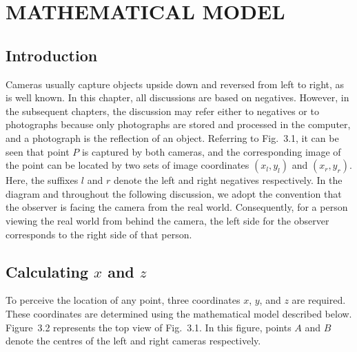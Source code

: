 \documentclass[12pt]{report}
\begin{document}
 \chapter{MATHEMATICAL MODEL} 
 \section{Introduction} 
 Cameras usually capture objects upside down and reversed from left to right, as is well known. In this chapter, all discussions are based on negatives. However, in the subsequent chapters, the discussion may refer either to negatives or to photographs because only photographs are stored and processed in the computer, and a photograph is the reflection of an object. Referring to Fig.~3.1, it can be seen that point $P$ is captured by both cameras, and the corresponding image of the point can be located by two sets of image coordinates $(x_l,y_l)$ and $(x_r,y_r)$. Here, the suffixes $l$ and $r$ denote the left and right negatives respectively. In the diagram and throughout the following discussion, we adopt the convention that the observer is facing the camera from the real world. Consequently, for a person viewing the real world from behind the camera, the left side for the observer corresponds to the right side of that person.
  \section{Calculating $x$ and $z$} To perceive the location of any point, three coordinates $x$, $y$, and $z$ are required. These coordinates are determined using the mathematical model described below. Figure~3.2 represents the top view of Fig.~3.1. In this figure, points $A$ and $B$ denote the centres of the left and right cameras respectively. 
  
\end{document}
